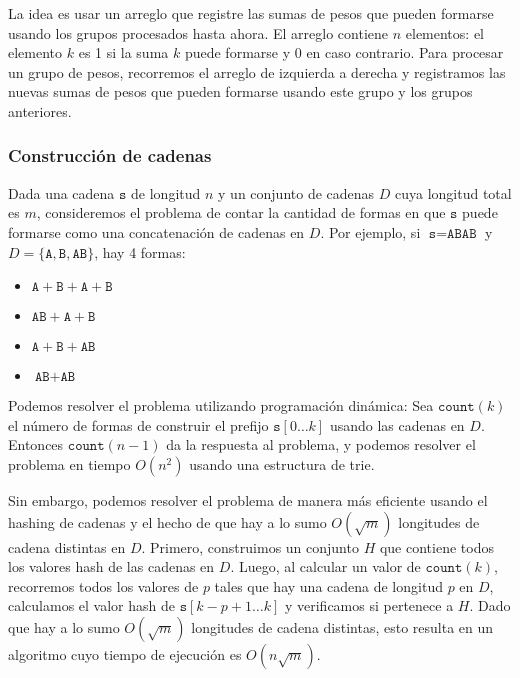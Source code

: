 La idea es usar un arreglo que registre las sumas de pesos
que pueden formarse usando los grupos procesados hasta ahora.
El arreglo contiene \( n \) elementos: el elemento \( k \) es 1 si la suma
\( k \) puede formarse y 0 en caso contrario.
Para procesar un grupo de pesos, recorremos el arreglo
de izquierda a derecha y registramos las nuevas sumas de pesos que
pueden formarse usando este grupo y los grupos anteriores.

\subsubsection{Construcción de cadenas}

Dada una cadena \( \texttt{s} \) de longitud \( n \)
y un conjunto de cadenas \( D \) cuya longitud total es \( m \),
consideremos el problema de contar la cantidad de formas
en que \( \texttt{s} \) puede formarse como una concatenación de cadenas en \( D \).
Por ejemplo,
si \( \texttt{s}=\texttt{ABAB} \) y
\( D=\{\texttt{A},\texttt{B},\texttt{AB}\} \),
hay 4 formas:

\begin{itemize}[noitemsep]
\item \( \texttt{A}+\texttt{B}+\texttt{A}+\texttt{B} \)
\item \( \texttt{AB}+\texttt{A}+\texttt{B} \)
\item \( \texttt{A}+\texttt{B}+\texttt{AB} \)
\item \( \texttt{AB}+\texttt{AB} \)
\end{itemize}

Podemos resolver el problema utilizando programación dinámica:
Sea \( \texttt{count}(k) \) el número de formas de construir el prefijo
\( \texttt{s}[0 \ldots k] \) usando las cadenas en \( D \).
Entonces \( \texttt{count}(n-1) \) da la respuesta al problema,
y podemos resolver el problema en tiempo \( O(n^2) \) usando una estructura de trie.

Sin embargo, podemos resolver el problema de manera más eficiente
usando el hashing de cadenas y el hecho de que hay a lo sumo \( O(\sqrt m) \)
longitudes de cadena distintas en \( D \).
Primero, construimos un conjunto \( H \) que contiene todos
los valores hash de las cadenas en \( D \).
Luego, al calcular un valor de \( \texttt{count}(k) \),
recorremos todos los valores de \( p \)
tales que hay una cadena de longitud \( p \) en \( D \),
calculamos el valor hash de \( \texttt{s}[k-p+1 \ldots k] \)
y verificamos si pertenece a \( H \).
Dado que hay a lo sumo \( O(\sqrt m) \) longitudes de cadena distintas,
esto resulta en un algoritmo cuyo tiempo de ejecución es \( O(n \sqrt m) \).

